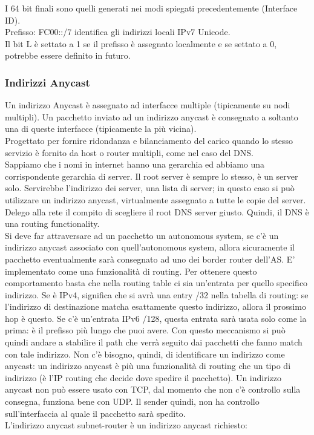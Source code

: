 \documentclass{article}
\begin{document}
I 64 bit finali sono quelli generati nei modi spiegati precedentemente (Interface ID). \\ Prefisso: FC00::/7 identifica gli indirizzi locali IPv7 Unicode. \\ Il bit L è settato a 1 se il prefisso è assegnato localmente e se settato a 0, potrebbe essere definito in futuro.

\subsubsection{Indirizzi Anycast}
Un indirizzo Anycast è assegnato ad interfacce multiple (tipicamente su nodi multipli). Un pacchetto inviato ad un indirizzo anycast è consegnato a soltanto una di queste interfacce (tipicamente la più vicina). \\ Progettato per fornire ridondanza e bilanciamento del carico quando lo stesso servizio è fornito da host o router multipli, come nel caso del DNS. \\ Sappiamo che i nomi in internet hanno una gerarchia ed abbiamo una corrispondente gerarchia di server. Il root server è sempre lo stesso, è un server solo. Servirebbe l'indirizzo dei server, una lista di server; in questo caso si può utilizzare un indirizzo anycast, virtualmente assegnato a tutte le copie del server. Delego alla rete il compito di scegliere il root DNS server giusto. Quindi, il DNS è una routing functionality. \\ Si deve far attraversare ad un pacchetto un autonomous system, se c'è un indirizzo anycast associato con quell'autonomous system, allora sicuramente il pacchetto eventualmente sarà consegnato ad uno dei border router dell'AS. E' implementato come una funzionalità di routing. Per ottenere questo comportamento basta che nella routing table ci sia un'entrata per quello specifico indirizzo. Se è IPv4, significa che si avrà una entry /32 nella tabella di routing: se l'indirizzo di destinazione matcha esattamente questo indirizzo, allora il prossimo hop è questo. Se c'è un'entrata IPv6 /128, questa entrata sarà usata solo come la prima: è il prefisso più lungo che puoi avere. Con questo meccanismo si può quindi andare a stabilire il path che verrà seguito dai pacchetti che fanno match con tale indirizzo. Non c'è bisogno, quindi, di identificare un indirizzo come anycast: un indirizzo anycast è più una funzionalità di routing che un tipo di indirizzo (è l'IP routing che decide dove spedire il pacchetto). Un indirizzo anycast non può essere usato con TCP, dal momento che non c'è controllo sulla consegna, funziona bene con UDP. Il sender quindi, non ha controllo sull'interfaccia al quale il pacchetto sarà spedito. \\ L'indirizzo anycast subnet-router è un indirizzo anycast richiesto:
\end{document}
